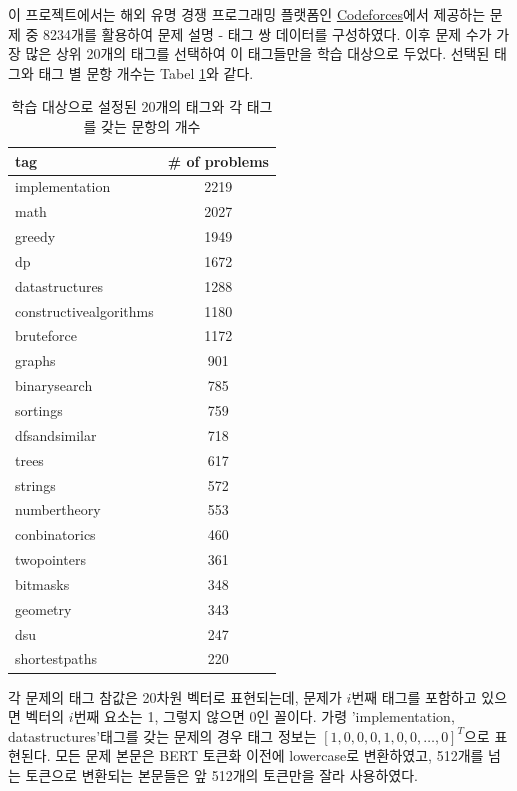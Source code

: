 \documentclass{article}
\begin{document}
이 프로젝트에서는 해외 유명 경쟁 프로그래밍 플랫폼인 \href{https://codeforces.com}{Codeforces}에서 제공하는 문제 중 8234개를 활용하여 문제 설명 - 태그 쌍 데이터를 구성하였다.
이후 문제 수가 가장 많은 상위 20개의 태그를 선택하여 이 태그들만을 학습 대상으로 두었다. 선택된 태그와 태그 별 문항 개수는 Tabel \ref{tags}와 같다.
\begin{table}[htb!]
    \begin{center}
        \begin{tabular}{lc}\toprule
            tag & \# of problems\\\midrule
            implementation & 2219\\
            math & 2027\\
            greedy & 1949\\
            dp & 1672\\
            datastructures & 1288\\
            constructivealgorithms & 1180\\
            bruteforce & 1172\\
            graphs & 901\\
            binarysearch & 785\\
            sortings & 759\\
            dfsandsimilar & 718\\
            trees & 617\\
            strings & 572\\
            numbertheory & 553\\
            conbinatorics & 460\\
            twopointers & 361\\
            bitmasks & 348\\
            geometry & 343\\
            dsu & 247\\
            shortestpaths & 220\\\bottomrule
        \end{tabular}
        \caption{학습 대상으로 설정된 20개의 태그와 각 태그를 갖는 문항의 개수}
        \label{tags}
    \end{center}
\end{table}

각 문제의 태그 참값은 20차원 벡터로 표현되는데, 문제가 $i$번째 태그를 포함하고 있으면 벡터의 $i$번째 요소는 1, 그렇지 않으면 0인 꼴이다.
가령 'implementation, datastructures'태그를 갖는 문제의 경우 태그 정보는 $[1, 0, 0, 0, 1, 0, 0, \ldots, 0]^T$으로 표현된다.
모든 문제 본문은 BERT 토큰화 이전에 lowercase로 변환하였고, 512개를 넘는 토큰으로 변환되는 본문들은 앞 512개의 토큰만을 잘라 사용하였다.
\end{document}
